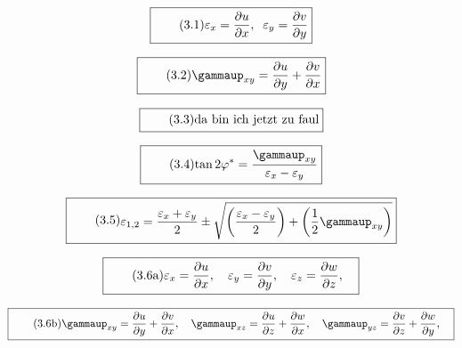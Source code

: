 \documentclass[11pt]{article}
\newcommand{\1}{ {\mathds{1}} }
\renewcommand{\epsilon}{\varepsilon}
\renewcommand{\gamma  }{\gammaup   }
\begin{document}
		\begin{equation}
			\boxed{
				\tag{3.1}
				\begin{split}
					\varepsilon_x
					=
					\frac{\partial u}{\partial x}, \;\;
					\varepsilon_y
					=
					\frac{\partial v}{\partial y}				 
				\end{split}
			}
		\end{equation}		

		\begin{equation}
			\boxed{
				\tag{3.2}
				\begin{split}
					\gamma_{xy}
					=
					\frac{\partial u}{\partial y}
					+
					\frac{\partial v}{\partial x}
				\end{split}
			}
		\end{equation}		

		\begin{equation}
			\boxed{
				\tag{3.3}
				\begin{split}
					\text{da bin ich jetzt zu faul}
				\end{split}
			}
		\end{equation}		

		\begin{equation}
			\boxed{
				\tag{3.4}
				\begin{split}
					\tan 2\varphi^\ast
					=
					\frac{\gamma_{xy}}{\varepsilon_x -\varepsilon_y}
				\end{split}
			}
		\end{equation}

		\begin{equation}
			\boxed{
				\tag{3.5}
				\begin{split}
					\epsilon_{1,2} = \frac{\epsilon_x + \epsilon_y}{2}
					\pm
					\sqrt{\left( \frac{\epsilon_x - \epsilon_y}{2}\right) + \left( \frac{1}{2} \gamma_{xy} \right) }
				\end{split}
			}
		\end{equation}		

		\begin{equation}
			\boxed{
				\tag{3.6a}
				\begin{split}
					\epsilon_x = \frac{\partial u}{\partial x}, \quad
					\epsilon_y = \frac{\partial v}{\partial y}, \quad
					\epsilon_z = \frac{\partial w}{\partial z}, \quad
				\end{split}
			}
		\end{equation}		

		\begin{equation}
			\boxed{
				\tag{3.6b}
				\begin{split}
					\gamma_{xy} = \frac{\partial u}{\partial y} + \frac{\partial v}{\partial x}, \quad
					\gamma_{xz} = \frac{\partial u}{\partial z} + \frac{\partial w}{\partial x}, \quad
					\gamma_{yz} = \frac{\partial v}{\partial z} + \frac{\partial w}{\partial y}, \quad
				\end{split}
			}
		\end{equation}		
\end{document}
